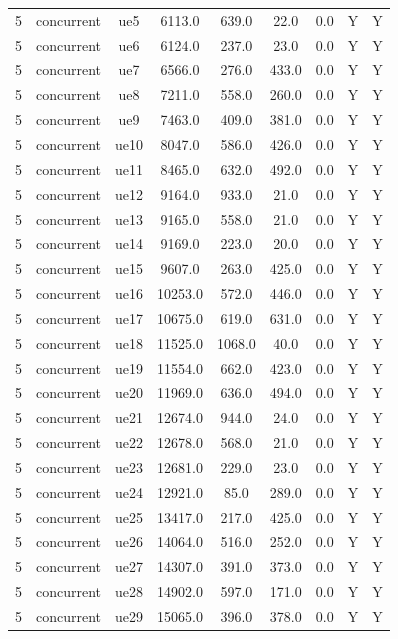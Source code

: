 \begin{table}[ht]
\begin{tabular}{|c|c|c|c|c|c|c|c|c|}
5 & concurrent & ue5 & 6113.0 & 639.0 & 22.0 & 0.0 & Y & Y \\
5 & concurrent & ue6 & 6124.0 & 237.0 & 23.0 & 0.0 & Y & Y \\
5 & concurrent & ue7 & 6566.0 & 276.0 & 433.0 & 0.0 & Y & Y \\
5 & concurrent & ue8 & 7211.0 & 558.0 & 260.0 & 0.0 & Y & Y \\
5 & concurrent & ue9 & 7463.0 & 409.0 & 381.0 & 0.0 & Y & Y \\
5 & concurrent & ue10 & 8047.0 & 586.0 & 426.0 & 0.0 & Y & Y \\
5 & concurrent & ue11 & 8465.0 & 632.0 & 492.0 & 0.0 & Y & Y \\
5 & concurrent & ue12 & 9164.0 & 933.0 & 21.0 & 0.0 & Y & Y \\
5 & concurrent & ue13 & 9165.0 & 558.0 & 21.0 & 0.0 & Y & Y \\
5 & concurrent & ue14 & 9169.0 & 223.0 & 20.0 & 0.0 & Y & Y \\
5 & concurrent & ue15 & 9607.0 & 263.0 & 425.0 & 0.0 & Y & Y \\
5 & concurrent & ue16 & 10253.0 & 572.0 & 446.0 & 0.0 & Y & Y \\
5 & concurrent & ue17 & 10675.0 & 619.0 & 631.0 & 0.0 & Y & Y \\
5 & concurrent & ue18 & 11525.0 & 1068.0 & 40.0 & 0.0 & Y & Y \\
5 & concurrent & ue19 & 11554.0 & 662.0 & 423.0 & 0.0 & Y & Y \\
5 & concurrent & ue20 & 11969.0 & 636.0 & 494.0 & 0.0 & Y & Y \\
5 & concurrent & ue21 & 12674.0 & 944.0 & 24.0 & 0.0 & Y & Y \\
5 & concurrent & ue22 & 12678.0 & 568.0 & 21.0 & 0.0 & Y & Y \\
5 & concurrent & ue23 & 12681.0 & 229.0 & 23.0 & 0.0 & Y & Y \\
5 & concurrent & ue24 & 12921.0 & 85.0 & 289.0 & 0.0 & Y & Y \\
5 & concurrent & ue25 & 13417.0 & 217.0 & 425.0 & 0.0 & Y & Y \\
5 & concurrent & ue26 & 14064.0 & 516.0 & 252.0 & 0.0 & Y & Y \\
5 & concurrent & ue27 & 14307.0 & 391.0 & 373.0 & 0.0 & Y & Y \\
5 & concurrent & ue28 & 14902.0 & 597.0 & 171.0 & 0.0 & Y & Y \\
5 & concurrent & ue29 & 15065.0 & 396.0 & 378.0 & 0.0 & Y & Y \\

\end{tabular}
\end{table}
